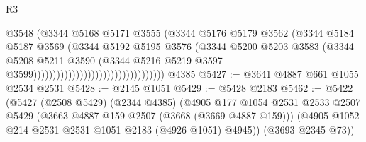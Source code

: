 \begin{lexlean}{R3}
\begin{coremodule}
                                                          @3548
                                                          (@3344
                                                            @5168
                                                            @5171
                                                            @3555
                                                            (@3344
                                                              @5176
                                                              @5179
                                                              @3562
                                                              (@3344
                                                                @5184
                                                                @5187
                                                                @3569
                                                                (@3344
                                                                  @5192
                                                                  @5195
                                                                  @3576
                                                                  (@3344
                                                                    @5200
                                                                    @5203
                                                                    @3583
                                                                    (@3344
                                                                      @5208
                                                                      @5211
                                                                      @3590
                                                                      (@3344
                                                                        @5216
                                                                        @5219
                                                                        @3597
                                                                        @3599))))))))))))))))))))))))))))))))))
    @4385
@5427 := @3641 @4887 @661 @1055 @2534 @2531
@5428 := @2145 @1051
@5429 := @5428 @2183
@5462 := @5422
    (@5427
      (@2508 @5429)
      (@2344 @4385)
      (@4905
        @177
        @1054
        @2531
        @2533
        @2507
        @5429
        (@3663 @4887 @159 @2507 (@3668 (@3669 @4887 @159)))
        (@4905 @1052 @214 @2531 @2531 @1051 @2183 (@4926 @1051) @4945))
      (@3693 @2345 @73))

\end{coremodule}
\end{lexlean}
